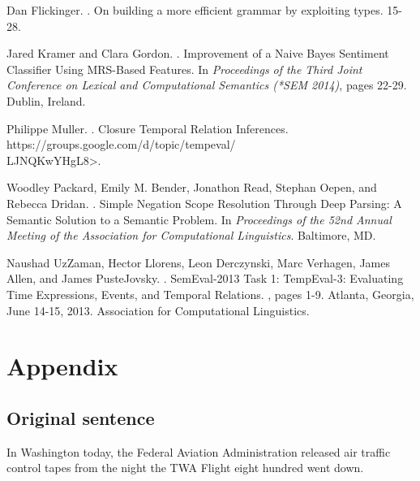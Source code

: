 \documentclass[11pt]{article}
\begin{document}
\begin{thebibliography}{}
Dan Flickinger.
.
\newblock On building a more efficient grammar by exploiting types.
 15-28.

Jared Kramer and Clara Gordon.
.
\newblock Improvement of a Naive Bayes Sentiment Classifier Using MRS-Based Features.
\newblock In {\em Proceedings of the Third Joint Conference on Lexical and Computational Semantics (*SEM 2014)}, pages 22-29.
\newblock Dublin, Ireland.

Philippe Muller.
.
\newblock Closure Temporal Relation Inferences.
\newblock {\textless}https://groups.google.com/d/topic/tempeval/\\LJNQKwYHgL8{\textgreater}.

Woodley Packard, Emily M. Bender, Jonathon Read, Stephan Oepen, and Rebecca Dridan.
.
\newblock Simple Negation Scope Resolution Through Deep Parsing: A Semantic Solution to a Semantic Problem.
\newblock In {\em Proceedings of the 52nd Annual Meeting of the Association for Computational Linguistics}.
\newblock Baltimore, MD.

Naushad UzZaman, Hector Llorens, Leon Derczynski, Marc Verhagen, James Allen, and James PusteJovsky.
.
\newblock SemEval-2013 Task 1: TempEval-3: Evaluating Time Expressions, Events, and Temporal Relations.
, pages 1-9.
\newblock Atlanta, Georgia, June 14-15, 2013.
\newblock Association for Computational Linguistics.

\end{thebibliography}

\onecolumn
\section*{Appendix}

\subsection*{Original sentence}
In Washington today, the Federal Aviation Administration released air traffic control tapes from the night the TWA Flight eight hundred went down.\\
\end{document}
